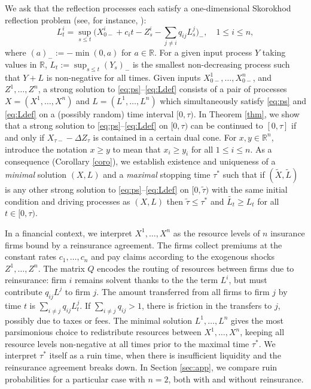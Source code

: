 \documentclass[12pt]{article}
\newcommand{\R}{\mathbb{R}}
\newcommand{\wt}{\widetilde}
\theoremstyle{plain}
\theoremstyle{definition}
\theoremstyle{remark}
\begin{document}
\medskip

We ask that the reflection processes each satisfy a one-dimensional Skorokhod reflection problem (see, for instance, \cite[Lemma 6.14]{karatzas_brownian_2014}):
\begin{equation}\label{eq:Ldef}
L_t^i=\sup_{s\le t}\bigg(X_{0-}^i+c_it-Z_s^i-\sum_{j\neq i}q_{ij}L_s^j\bigg)_-,\quad 1\le i\le n,
\end{equation}
where $(a)_-:=-\min(0,a)$ for $a\in\R$. For a given input process $Y$ taking values in $\R$, $L_t:=\sup_{s\le t} (Y_s)_-$ is the smallest non-decreasing process such that $Y+L$ is non-negative for all times. Given inputs $X_{0-}^1,\dots, X_{0-}^n$, and $Z^1,\dots,Z^n$, a strong solution to \eqref{eq:ps}--\eqref{eq:Ldef} consists of a pair of processes $X=(X^1,\dots,X^n)$ and $L=(L^1,\dots,L^n)$ which simultaneously satisfy \eqref{eq:ps} and \eqref{eq:Ldef} on a (possibly random) time interval $[0,\tau)$. 
In Theorem \ref{thm}, we show that a strong solution to \eqref{eq:ps}--\eqref{eq:Ldef} on $[0,\tau)$ can be continued to $[0,\tau]$ if and only if $X_{\tau-}-\Delta Z_\tau$ is contained in a certain dual cone. For $x,y\in\R^n$, introduce the notation $x\ge y$ to mean that $x_i\ge y_i$ for all $1\le i\le n$. As a consequence (Corollary \ref{coro}), we establish existence and uniqueness of a \emph{minimal} solution $(X,L)$ and a \emph{maximal} stopping time $\tau^*$ such that if $(\wt{X},\wt{L})$ is any other strong solution to \eqref{eq:ps}--\eqref{eq:Ldef} on $[0,\wt\tau)$ with the same initial condition and driving processes as $(X,L)$ then $\wt\tau\le\tau^*$ and $\wt{L_t}\ge L_t$ for all $t\in[0,\tau)$. 


\medskip

In a financial context, we interpret $X^1,\dots,X^n$ as the resource levels of $n$ insurance firms bound by a reinsurance agreement. The firms collect premiums at the constant rates $c_1,\dots,c_n$ and pay claims according to the exogenous shocks $Z^1,\dots,Z^n$. The matrix $Q$ encodes the routing of resources between firms due to reinsurance: firm $i$ remains solvent thanks to the the term $L^i$, but must contribute $q_{ij}L^j$ to firm $j$. The amount transferred from all firms to firm $j$ by time $t$ is $\sum_{i\neq j} q_{ij}L^j_t$. If $\sum_{i\neq j} q_{ij}>1$, there is friction in the transfers to $j$, possibly due to taxes or fees. The minimal solution $L^1,\dots,L^n$ gives the most parsimonious choice to redistribute resources between $X^1,\dots,X^n$, keeping all resource levels non-negative at all times prior to the maximal time $\tau^*$. We interpret $\tau^*$ itself as a ruin time, when there is insufficient liquidity and the reinsurance agreement breaks down. In Section \ref{sec:app}, we compare ruin probabilities for a particular case with $n=2$, both with and without reinsurance.
\end{document}

